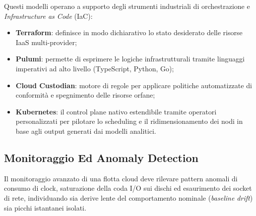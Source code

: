 \documentclass[11pt, a4paper]{article}
\begin{document}
Questi modelli operano a supporto degli strumenti industriali di orchestrazione e \emph{Infrastructure as Code} (IaC):
\begin{itemize}
    \item \textbf{Terraform}: definisce in modo dichiarativo lo stato desiderato delle risorse IaaS multi-provider;
    \item \textbf{Pulumi}: permette di esprimere le logiche infrastrutturali tramite linguaggi imperativi ad alto livello (TypeScript, Python, Go);
    \item \textbf{Cloud Custodian}: motore di regole per applicare politiche automatizzate di conformità e spegnimento delle risorse orfane;
    \item \textbf{Kubernetes}: il control plane nativo estendibile tramite operatori personalizzati per pilotare lo scheduling e il ridimensionamento dei nodi in base agli output generati dai modelli analitici.
\end{itemize}


\subsection{Monitoraggio Ed Anomaly Detection}

Il monitoraggio avanzato di una flotta cloud deve rilevare pattern anomali di consumo di clock, saturazione della coda I/O sui dischi ed esaurimento dei socket di rete, individuando sia derive lente del comportamento nominale (\emph{baseline drift}) sia picchi istantanei isolati.
\end{document}
